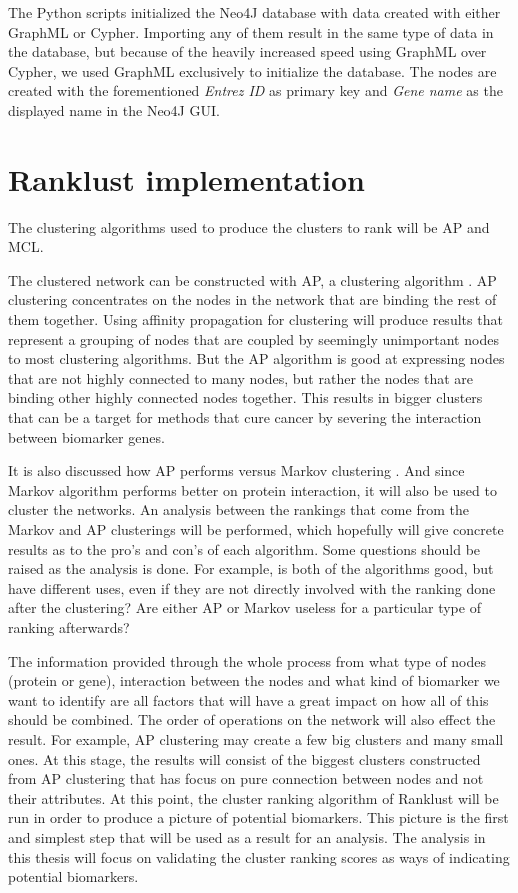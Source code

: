 The Python scripts initialized the Neo4J database with data created with either
GraphML or Cypher. Importing any of them result in the same type of data in the
database, but because of the heavily increased speed using GraphML over Cypher,
we used GraphML exclusively to initialize the database. The nodes are created
with the forementioned \textit{Entrez ID} as primary key and \textit{Gene name}
as the displayed name in the Neo4J GUI.

\chapter{Ranklust implementation}
The clustering algorithms used to produce the clusters to rank will be AP and
MCL.

The clustered network can be constructed with AP, a clustering algorithm
\cite{affinity-propagation}. AP clustering concentrates on the nodes in the
network that are binding the rest of them together. Using affinity propagation
for clustering will produce results that represent a grouping of nodes that are
coupled by seemingly unimportant nodes to most clustering algorithms. But the AP
algorithm is good at expressing nodes that are not highly connected to many
nodes, but rather the nodes that are binding other highly connected nodes
together. This results in bigger clusters that can be a target for methods that
cure cancer by severing the interaction between biomarker genes.

It is also discussed how AP performs versus Markov clustering \cite{ap-vs-mcl}.
And since Markov algorithm performs better on protein interaction, it will also
be used to cluster the networks. An analysis between the rankings that come from
the Markov and AP clusterings will be performed, which hopefully will give
concrete results as to the pro's and con's of each algorithm. Some questions
should be raised as the analysis is done. For example, is both of the algorithms
good, but have different uses, even if they are not directly involved with the
ranking done after the clustering?  Are either AP or Markov useless for
a particular type of ranking afterwards?

The information provided through the whole process from what type of nodes
(protein or gene), interaction between the nodes and what kind of biomarker we
want to identify are all factors that will have a great impact on how all of
this should be combined. The order of operations on the network will also effect
the result. For example, AP clustering may create a few big clusters and many
small ones. At this stage, the results will consist of the biggest clusters
constructed from AP clustering that has focus on pure connection between nodes
and not their attributes. At this point, the cluster ranking algorithm of
Ranklust will be run in order to produce a picture of potential biomarkers. This
picture is the first and simplest step that will be used as a result for an
analysis. The analysis in this thesis will focus on validating the cluster
ranking scores as ways of indicating potential biomarkers. 

